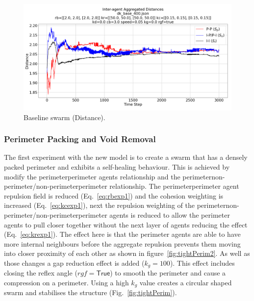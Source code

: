 \documentclass[12pt,a4paper]{IEEEtran}
\newcommand{\kg}{\mathit{k_g}}
\newcommand{\rgf}{\mathit{rgf}}
\begin{document}
\begin{figure}[H]
	\begin{center}
		\includegraphics[width=1.0\linewidth]{figures/baselineDistance}
	\end{center}
	\caption{Baseline swarm (Distance). \label{fig:baselineDistance}}
\end{figure}

\subsubsection{Perimeter Packing and Void Removal}\label{sec:perimCompress}

The first experiment with the new model is to create a swarm that has a densely packed perimeter and exhibits a self-healing behaviour. This is achieved by modify the perimeter\textrightarrow perimeter agents relationship and the perimeter\textrightarrow non-perimeter/non-perimeter\textrightarrow perimeter relationship. The perimeter\textrightarrow perimeter agent repulsion field is reduced (Eq.~\ref{eq:rbexp1}) and the cohesion weighting is increased (Eq.~\ref{eq:kcexp1}), next the repulsion weighting of the  perimeter\textrightarrow non-perimeter/non-perimeter\textrightarrow perimeter agents is reduced to allow the perimeter agents to pull closer together without the next layer of agents reducing the effect (Eq.~\ref{eq:krexp1}). The effect here is that the perimeter agents are able to have more internal neighbours before the aggregate repulsion prevents them moving into closer proximity of each other as shown in figure~\ref{fig:tightPerim2}. As well as those changes a gap reduction effect is added ($\kg=100$). This effect includes closing the reflex angle ($\rgf=\mathsf{True}$) to smooth the perimeter and cause a  compression on a perimeter. Using a high $\kg$ value creates a circular shaped swarm and stabilises the structure (Fig.~\ref{fig:tightPerim}).
\end{document}
